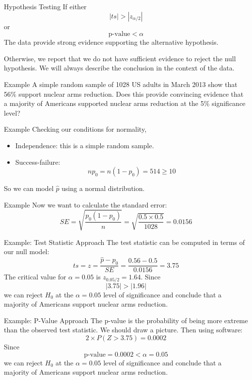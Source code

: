 \begin{frame}{Hypothesis Testing}
    If either 
    \[
        |ts| > |z_{\alpha/2}|
    \]
    or 
    \[
        \text{p-value} < \alpha
    \]
    The data provide strong evidence supporting the alternative hypothesis. 
    
    \vspace{12pt}Otherwise, we report that we do not have sufficient evidence to reject the null hypothesis. We will always describe the conclusion in the context of the data.
\end{frame}

\begin{frame}{Example}
    A simple random sample of 1028 US adults in March 2013 show that 56\% support nuclear arms reduction. Does this provide convincing evidence that a majority of Americans supported nuclear arms reduction at the 5\% significance level?
\end{frame}

\begin{frame}{Example}
    Checking our conditions for normality,
    \begin{itemize}
        \item Independence: this is a simple random sample.
        \item Success-failure: 
        \[
            np_0 = n(1-p_0) = 514 \ge 10
        \]
    \end{itemize}
    So we can model $\hat{p}$ using a normal distribution.
\end{frame}

\begin{frame}{Example}
    Now we want to calculate the standard error:
    \[
        SE = \sqrt{\frac{p_0(1-p_0)}{n}} = \sqrt{\frac{0.5\times0.5}{1028}} = 0.0156
    \] 
\end{frame}

\begin{frame}{Example: Test Statistic Approach}
    The test statistic can be computed in terms of our null model:
    \[
     ts = z = \frac{\hat{p} - p_0}{SE} = \frac{0.56 - 0.5}{0.0156} = 3.75
    \]
    The critical value for $\alpha=0.05$ is $z_{0.05/2} = 1.64$. Since
    \[
        |3.75| > |1.96|
    \]
    we can reject $H_0$ at the $\alpha=0.05$ level of significance and conclude that a majority of Americans support nuclear arms reduction. 
\end{frame}

\begin{frame}{Example: P-Value Approach}
    The p-value is the probability of being more extreme than the observed test statistic. We should draw a picture. Then using software:
    \[
        2 \times P(Z > 3.75) = 0.0002
    \]
    Since
    \[
        \text{p-value} = 0.0002 < \alpha = 0.05
    \]
    we can reject $H_0$ at the $\alpha=0.05$ level of significance and conclude that a majority of Americans support nuclear arms reduction.
\end{frame}

